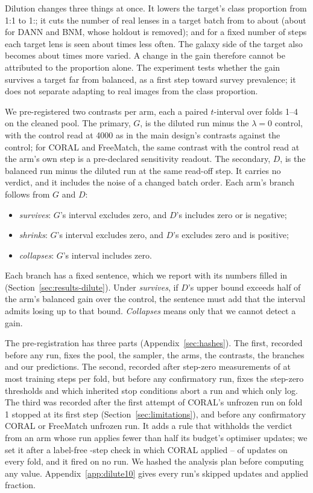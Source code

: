 Dilution changes three things at once. It lowers the target's class proportion from 1:1 to
1:\dlRatio{}; it cuts the number of real lenses in a target batch from \dlBatchLensBal{} to
about \dlBatchLens{} (about \dlBatchLensTrain{} for DANN and BNM, whose holdout is removed); and for a fixed number of steps each target lens is seen about
\dlExposureRatio{} times less often. The galaxy side of the target also becomes about
\dlRatio{} times more varied. A change in the gain therefore cannot be attributed to the
proportion alone. The experiment tests whether the gain survives a target far from balanced, as
a first step toward survey prevalence; it does not separate adapting to real images from the
class proportion.

We pre-registered two contrasts per arm, each a paired $t$-interval over folds 1--4 on the
cleaned pool. The primary, $G$, is the diluted run minus the $\lambda=0$ control, with the
control read at 4000 as in the main design's contrasts against the control; for CORAL and FreeMatch,
the same contrast with the control read at the arm's own step is a pre-declared sensitivity
readout. The secondary, $D$, is the balanced run minus the diluted run at the same read-off
step. It carries no verdict, and it includes the noise of a changed batch order. Each arm's
branch follows from $G$ and $D$:
\begin{itemize}
\item \emph{survives}: $G$'s interval excludes zero, and $D$'s includes zero or is negative;
\item \emph{shrinks}: $G$'s interval excludes zero, and $D$'s excludes zero and is positive;
\item \emph{collapses}: $G$'s interval includes zero.
\end{itemize}
Each branch has a fixed sentence, which we report with its numbers filled in
(Section~\ref{sec:results-dilute}). Under \emph{survives}, if $D$'s upper bound exceeds half of
the arm's balanced gain over the control, the sentence must add that the interval admits losing
up to that bound. \emph{Collapses} means only that we cannot detect a gain.

The pre-registration has three parts (Appendix~\ref{sec:hashes}). The first, recorded before
any run, fixes the pool, the sampler, the arms, the contrasts, the branches and our predictions.
The second, recorded after step-zero measurements of at most \dlPartTwoMaxStepsWord{}
training steps per fold, but before any confirmatory run, fixes the step-zero thresholds and which inherited
stop conditions abort a run and which only log. The third was recorded after the first attempt
of CORAL's unfrozen run on fold 1 stopped at its first step (Section~\ref{sec:limitations}), and
before any confirmatory CORAL or FreeMatch unfrozen run. It adds a rule that withholds the verdict from an arm whose run applies fewer than half its
budget's optimiser updates; we set it after a label-free \dlCoralCheckSteps{}-step check in which
CORAL applied \dlCoralCheckAppliedMin{}--\dlCoralCheckAppliedMax{} of \dlCoralCheckSteps{} updates
on every fold, and it fired on no run.
We hashed the analysis plan before computing any value. Appendix~\ref{app:dilute10} gives every
run's skipped updates and applied fraction.
